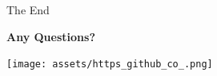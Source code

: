 \documentclass[9pt, dvipsnames]{beamer}
\begin{document}
    \begin{frame}{\textellipsis The End}
        \begin{center}
            {\huge \textbf{Any Questions?}}
        \end{center}
        \begin{center}
            \texttt{[image: assets/https\_github\_co\_.png]}
        \end{center}
    \end{frame}
\end{document}
